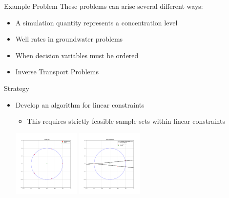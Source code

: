 \documentclass{beamer}
\begin{document}
\begin{frame}{Example Problem}
	These problems can arise several different ways:
	\begin{itemize}
		\item A simulation quantity represents a concentration level
		\item Well rates in groundwater problems
		\item When decision variables must be ordered
		\item Inverse Transport Problems
	\end{itemize}
% 
% 
% 
% 
% 
% 
% 

\end{frame}











\begin{frame}{Strategy}
	\begin{itemize}
		\item Develop an algorithm for linear constraints
		\begin{itemize}
			\item This requires strictly feasible sample sets within linear constraints
		\end{itemize}
		\begin{center}
			\includegraphics[width=125px]{images/poised.png}
			\includegraphics[width=125px]{images/not_poised.png}
		\end{center}
	\end{itemize}
\end{frame}
\end{document}
